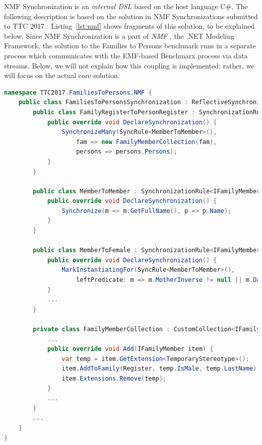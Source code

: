 NMF Synchronization is an \emph{internal DSL} based on the host language C\#. The following description is based on the solution in NMF Synchronizations submitted to TTC 2017 \cite{Hinkel2017}. Listing~\ref{lst:nmf} shows fragments of this solution, to be explained below. Since NMF Synchronization is a part of \emph{NMF} \cite{Hinkel2016}, the .NET Modeling Framework, the solution to the Families to Persons benchmark runs in a separate process which communicates with the EMF-based Benchmarx process via data streams. Below, we will not explain how this coupling is implemented; rather, we will focus on the actual core solution.





\begin{lstlisting}[label={lst:nmf}, float=*t, language=cs, caption={Solution in NMF Synchronizations}]
namespace TTC2017.FamiliesToPersons.NMF {
    public class FamiliesToPersonsSynchronization : ReflectiveSynchronization {
        public class FamilyRegisterToPersonRegister : SynchronizationRule<FamilyRegister, PersonRegister> {
            public override void DeclareSynchronization() {
                SynchronizeMany(SyncRule<MemberToMember>(),
                    fam => new FamilyMemberCollection(fam),
                    persons => persons.Persons);
            }
        }

        public class MemberToMember : SynchronizationRule<IFamilyMember, IPerson> {
            public override void DeclareSynchronization() {
                Synchronize(m => m.GetFullName(), p => p.Name);
            }
        }
        
        public class MemberToFemale : SynchronizationRule<IFamilyMember, IFemale> {
            public override void DeclareSynchronization() {
                MarkInstantiatingFor(SyncRule<MemberToMember>(), 
                    leftPredicate: m => m.MotherInverse != null || m.DaughtersInverse != null);
            }
            ...
        }
        
        private class FamilyMemberCollection : CustomCollection<IFamilyMember> {
            ...
            public override void Add(IFamilyMember item) {
                var temp = item.GetExtension<TemporaryStereotype>();
                item.AddToFamily(Register, temp.IsMale, temp.LastName);
                item.Extensions.Remove(temp);
            }
            ...
        }
        ...
    }
}
\end{lstlisting} 

